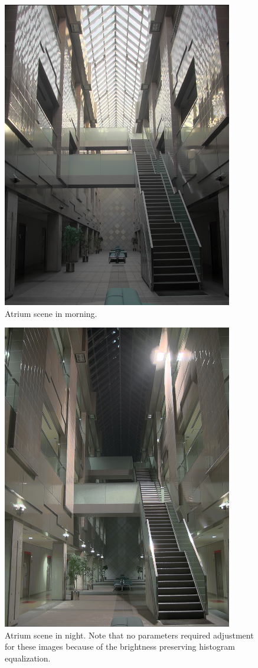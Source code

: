 \documentclass[twocolumn]{article}
\begin{document}
\begin{figure}[h!]
	\centering
	\includegraphics[scale=0.5]{atrium_morning}
	\caption{Atrium scene in morning.}
\end{figure}

\begin{figure}[h!]
	\centering
	\includegraphics[scale=0.5]{atrium_night}
	\caption{Atrium scene in night. Note that no parameters required adjustment for these images because of the brightness preserving histogram equalization.}
\end{figure}
\end{document}
